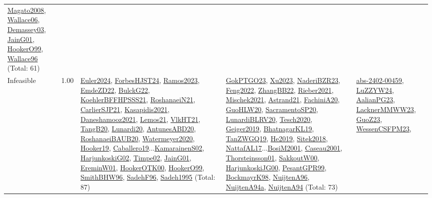 {\begin{longtable}{p{3cm}r>{\raggedright\arraybackslash}p{6cm}>{\raggedright\arraybackslash}p{6cm}>{\raggedright\arraybackslash}p{8cm}}
\hyperref[detail:Magato2008]{Magato2008}, \hyperref[detail:Wallace06]{Wallace06}, \hyperref[detail:Demassey03]{Demassey03}, \hyperref[detail:JainG01]{JainG01}, \hyperref[detail:HookerO99]{HookerO99}, \hyperref[detail:Wallace96]{Wallace96} (Total: 61)\\
\index{Infeasible}\index{Concepts!Infeasible}Infeasible &  1.00 & \hyperref[detail:Euler2024]{Euler2024}, \hyperref[detail:ForbesHJST24]{ForbesHJST24}, \hyperref[detail:Ramos2023]{Ramos2023}, \hyperref[detail:EmdeZD22]{EmdeZD22}, \hyperref[detail:BulckG22]{BulckG22}, \hyperref[detail:KoehlerBFFHPSSS21]{KoehlerBFFHPSSS21}, \hyperref[detail:RoshanaeiN21]{RoshanaeiN21}, \hyperref[detail:CarlierSJP21]{CarlierSJP21}, \hyperref[detail:Kasapidis2021]{Kasapidis2021}, \hyperref[detail:Daneshamooz2021]{Daneshamooz2021}, \hyperref[detail:Lemos21]{Lemos21}, \hyperref[detail:VlkHT21]{VlkHT21}, \hyperref[detail:TangB20]{TangB20}, \hyperref[detail:Lunardi20]{Lunardi20}, \hyperref[detail:AntunesABD20]{AntunesABD20}, \hyperref[detail:RoshanaeiBAUB20]{RoshanaeiBAUB20}, \hyperref[detail:Watermeyer2020]{Watermeyer2020}, \hyperref[detail:Hooker19]{Hooker19}, \hyperref[detail:Caballero19]{Caballero19}...\hyperref[detail:KamarainenS02]{KamarainenS02}, \hyperref[detail:HarjunkoskiG02]{HarjunkoskiG02}, \hyperref[detail:Timpe02]{Timpe02}, \hyperref[detail:JainG01]{JainG01}, \hyperref[detail:EreminW01]{EreminW01}, \hyperref[detail:HookerOTK00]{HookerOTK00}, \hyperref[detail:HookerO99]{HookerO99}, \hyperref[detail:SmithBHW96]{SmithBHW96}, \hyperref[detail:SadehF96]{SadehF96}, \hyperref[detail:Sadeh1995]{Sadeh1995} (Total: 87) & \hyperref[detail:GokPTGO23]{GokPTGO23}, \hyperref[detail:Xu2023]{Xu2023}, \hyperref[detail:NaderiBZR23]{NaderiBZR23}, \hyperref[detail:Feng2022]{Feng2022}, \hyperref[detail:ZhangBB22]{ZhangBB22}, \hyperref[detail:Rieber2021]{Rieber2021}, \hyperref[detail:Mischek2021]{Mischek2021}, \hyperref[detail:Astrand21]{Astrand21}, \hyperref[detail:FachiniA20]{FachiniA20}, \hyperref[detail:GuoHLW20]{GuoHLW20}, \hyperref[detail:SacramentoSP20]{SacramentoSP20}, \hyperref[detail:LunardiBLRV20]{LunardiBLRV20}, \hyperref[detail:Tesch2020]{Tesch2020}, \hyperref[detail:Geiger2019]{Geiger2019}, \hyperref[detail:BhatnagarKL19]{BhatnagarKL19}, \hyperref[detail:TanZWGQ19]{TanZWGQ19}, \hyperref[detail:He2019]{He2019}, \hyperref[detail:Sitek2018]{Sitek2018}, \hyperref[detail:NattafAL17]{NattafAL17}...\hyperref[detail:BosiM2001]{BosiM2001}, \hyperref[detail:Caseau2001]{Caseau2001}, \hyperref[detail:Thorsteinsson01]{Thorsteinsson01}, \hyperref[detail:SakkoutW00]{SakkoutW00}, \hyperref[detail:HarjunkoskiJG00]{HarjunkoskiJG00}, \hyperref[detail:PesantGPR99]{PesantGPR99}, \hyperref[detail:BockmayrK98]{BockmayrK98}, \hyperref[detail:NuijtenA96]{NuijtenA96}, \hyperref[detail:NuijtenA94a]{NuijtenA94a}, \hyperref[detail:NuijtenA94]{NuijtenA94} (Total: 73) & \hyperref[detail:abs-2402-00459]{abs-2402-00459}, \hyperref[detail:LuZZYW24]{LuZZYW24}, \hyperref[detail:AalianPG23]{AalianPG23}, \hyperref[detail:LacknerMMWW23]{LacknerMMWW23}, \hyperref[detail:GuoZ23]{GuoZ23}, \hyperref[detail:WessenCSFPM23]{WessenCSFPM23}, 
\end{longtable}}
